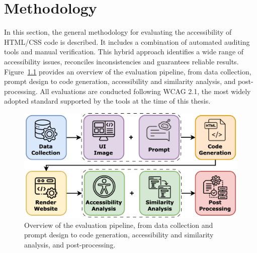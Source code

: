 \chapter{Methodology}
\label{chapter:Methodology}

In this section, the general methodology for evaluating the 
accessibility of HTML/CSS code is described. It includes a combination
of automated auditing tools and manual verification. This hybrid approach 
identifies a wide range of accessibility issues, reconciles inconsistencies and guarantees reliable results. 
Figure~\ref{fig:pipeline} provides an overview of the evaluation pipeline, 
from data collection, prompt design to code generation, accessibility and similarity analysis,
and post-processing.
All evaluations are conducted following WCAG 2.1, the most widely 
adopted standard supported by the tools at the time of this thesis.

\begin{figure}
  \centering
  \includegraphics[width=0.5\linewidth]{figures/pipeline_modern.png}
  \caption{Overview of the evaluation pipeline, from data collection and prompt design to code generation, accessibility and similarity analysis, and post-processing.}
  \label{fig:pipeline} 
\end{figure}

